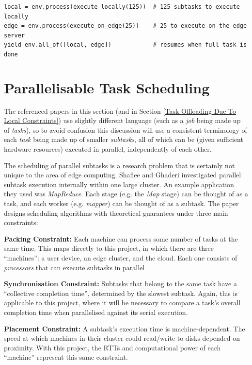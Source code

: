 \documentclass[]{UCD_CS_FYP_Report}
\begin{document}
\begin{verbatim}
local = env.process(execute_locally(125))  # 125 subtasks to execute locally
edge = env.process(execute_on_edge(25))    # 25 to execute on the edge server
yield env.all_of([local, edge])            # resumes when full task is done
\end{verbatim}

\section{Parallelisable Task Scheduling} \label{Parallelisable Task Scheduling}
The referenced papers in this section (and in Section \ref{Task Offloading Due To Local Constraints}) use slightly different language (such as a \textit{job} being made up of \textit{tasks}), so to avoid confusion this discussion will use a consistent terminology of each \textit{task} being made up of smaller \textit{subtasks}, all of which can be (given sufficient hardware resources) executed in parallel, independently of each other.

The scheduling of parallel subtasks is a research problem that is certainly not unique to the area of edge computing. Shafiee and Ghaderi \cite{shafiee2020parallel} investigated parallel subtask execution internally within one large cluster. An example application they used was \textit{MapReduce}. Each stage (e.g. the \textit{Map} stage) can be thought of as a task, and each worker (e.g. \textit{mapper}) can be thought of as a subtask. The paper designs scheduling algorithms with theoretical guarantees under three main constraints:

\textbf{Packing Constraint:} Each machine can process some number of tasks at the same time. This maps directly to this project, in which there are three \enquote{machines}: a user device, an edge cluster, and the cloud. Each one consists of \textit{processors} that can execute subtasks in parallel

\textbf{Synchronisation Constraint:} Subtasks that belong to the same task have a \enquote{collective completion time}, determined by the slowest subtask. Again, this is applicable to this project, where it will be necessary to compare a task's overall completion time when parallelised against its serial execution.

\textbf{Placement Constraint:} A subtask's execution time is machine-dependent. The speed at which machines in their cluster could read/write to disks depended on proximity. With this project, the RTTs and computational power of each \enquote{machine} represent this same constraint.
\end{document}

